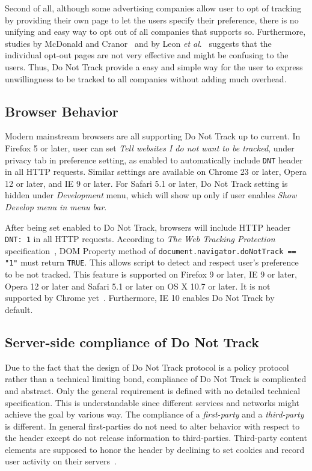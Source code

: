 \documentclass{sig-alternate}
\begin{document}
Second of all, although some advertising companies allow user to opt of tracking by providing their own page to let the users specify their preference, there is no unifying and easy way to opt out of all companies that supports so. Furthermore, studies by McDonald and Cranor~\cite{mcdonald2010beliefs} and by Leon \emph{et al}.~\cite{leon2012johnny} suggests that the individual opt-out pages are not very effective and might be confusing to the users. Thus, Do Not Track provide a easy and simple way for the user to express unwillingness to be tracked to all companies without adding much overhead.

\subsection*{Browser Behavior} \label{sec:browserbehavior}

Modern mainstream browsers are all supporting Do Not Track up to current. In Firefox 5 or later, user can set \emph{Tell websites I do not want to be tracked}, under privacy tab in preference setting, as enabled to automatically include \texttt{DNT} header in all HTTP requests. Similar settings are available on Chrome 23 or later, Opera 12 or later, and IE 9 or later. For Safari 5.1 or later, Do Not Track setting is hidden under \emph{Development} menu, which will show up only if user enables \emph{Show Develop menu in menu bar}.

After being set enabled to Do Not Track, browsers will include HTTP header \verb|DNT: 1| in all HTTP requests. According to \emph{The Web Tracking Protection} specification~\cite{w3cwtp}, DOM Property method of \verb|document.navigator.doNotTrack == "1"| must return \verb|TRUE|. This allows script to detect and respect user's preference to be not tracked. This feature is supported on Firefox 9 or later, IE 9 or later, Opera 12 or later and Safari 5.1 or later on OS X 10.7 or later. It is not supported by Chrome yet~\cite{navigatordnt}. Furthermore, IE 10 enables Do Not Track by default.~\cite{wikidnt}

\subsection*{Server-side compliance of Do Not Track}

Due to the fact that the design of Do Not Track protocol is a policy protocol rather than a technical limiting bond, compliance of Do Not Track is complicated and abstract. Only the general requirement is defined with no detailed technical specification. This is understandable since different services and networks might achieve the goal by various way. The compliance of a \emph{first-party} and a \emph{third-party} is different. In general first-parties do not need to alter behavior with respect to the header except do not release information to third-parties. Third-party content elements are supposed to honor the header by declining to set cookies and record user activity on their servers~\cite{donotbeg}.
\end{document}

